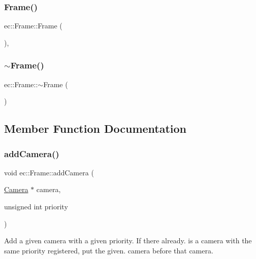 \subsubsection{\texorpdfstring{Frame()}{Frame()}}
{\footnotesize\ttfamily ec\+::\+Frame\+::\+Frame (\begin{DoxyParamCaption}{ }\end{DoxyParamCaption})\hspace{0.3cm}{\ttfamily [explicit]}, {\ttfamily [default]}}

\mbox{\label{classec_1_1_frame_af2b2c733cacb47d99e460a2b75667eaa}} 
\subsubsection{\texorpdfstring{$\sim$\+Frame()}{~Frame()}}
{\footnotesize\ttfamily ec\+::\+Frame\+::$\sim$\+Frame (\begin{DoxyParamCaption}{ }\end{DoxyParamCaption})\hspace{0.3cm}{\ttfamily [default]}}



\subsection{Member Function Documentation}
\mbox{\label{classec_1_1_frame_a04ba39407bc0f6e78fe47f37b3f19131}} 
\subsubsection{\texorpdfstring{add\+Camera()}{addCamera()}}
{\footnotesize\ttfamily void ec\+::\+Frame\+::add\+Camera (\begin{DoxyParamCaption}\item[{\mbox{\hyperlink{classec_1_1_camera}{Camera}} $\ast$}]{camera,  }\item[{unsigned int}]{priority }\end{DoxyParamCaption})}



Add a given camera with a given priority. If there already. is a camera with the same priority registered, put the given. camera before that camera. 


